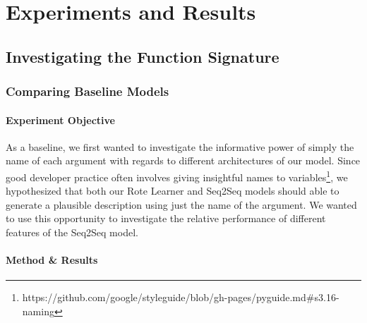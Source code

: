 \chapter{Experiments and Results}
\label{experiments_and_results}

\section{Investigating the Function Signature} %
\label{sec:investigating_function_sig}

\subsection{Comparing Baseline Models} %
\label{sub:comparing_baseline_models}





\subsubsection{Experiment Objective} %

As a baseline, we first wanted to investigate the informative power of simply the name of each argument with regards to different architectures of our model.
Since good developer practice often involves giving insightful names to variables\footnote{https://github.com/google/styleguide/blob/gh-pages/pyguide.md\#s3.16-naming}, we hypothesized that
 both our Rote Learner and Seq2Seq models should able to generate a plausible description using just the name of the argument.
We wanted to use this opportunity to investigate the relative performance of different features of the Seq2Seq model.

\subsubsection{Method \& Results} %

